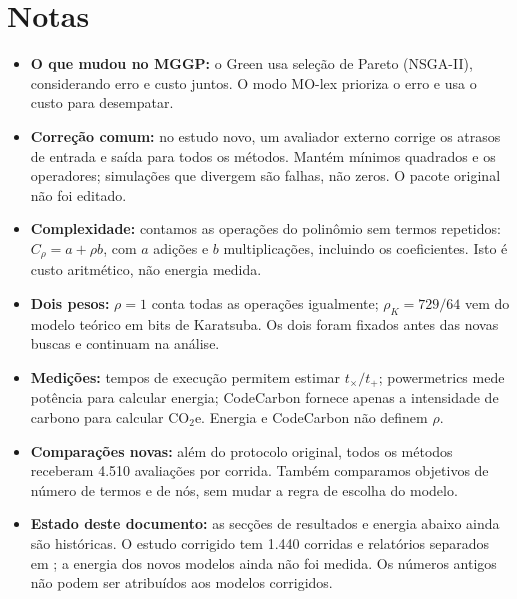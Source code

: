 \section*{Notas}
\begin{itemize}
\item \textbf{O que mudou no MGGP:} o Green usa seleção de Pareto (NSGA-II), considerando erro e custo juntos. O modo MO-lex prioriza o erro e usa o custo para desempatar.
\item \textbf{Correção comum:} no estudo novo, um avaliador externo corrige os atrasos de entrada e saída para todos os métodos. Mantém mínimos quadrados e os operadores; simulações que divergem são falhas, não zeros. O pacote original não foi editado.
\item \textbf{Complexidade:} contamos as operações do polinômio sem termos repetidos: $C_\rho=a+\rho b$, com $a$ adições e $b$ multiplicações, incluindo os coeficientes. Isto é custo aritmético, não energia medida.
\item \textbf{Dois pesos:} $\rho=1$ conta todas as operações igualmente; $\rho_K=729/64$ vem do modelo teórico em bits de Karatsuba. Os dois foram fixados antes das novas buscas e continuam na análise.
\item \textbf{Medições:} tempos de execução permitem estimar $t_\times/t_+$; powermetrics mede potência para calcular energia; CodeCarbon fornece apenas a intensidade de carbono para calcular CO$_2$e. Energia e CodeCarbon não definem $\rho$.
\item \textbf{Comparações novas:} além do protocolo original, todos os métodos receberam 4.510 avaliações por corrida. Também comparamos objetivos de número de termos e de nós, sem mudar a regra de escolha do modelo.
\item \textbf{Estado deste documento:} as secções de resultados e energia abaixo ainda são históricas. O estudo corrigido tem 1.440 corridas e relatórios separados em ; a energia dos novos modelos ainda não foi medida. Os números antigos não podem ser atribuídos aos modelos corrigidos.
\end{itemize}

